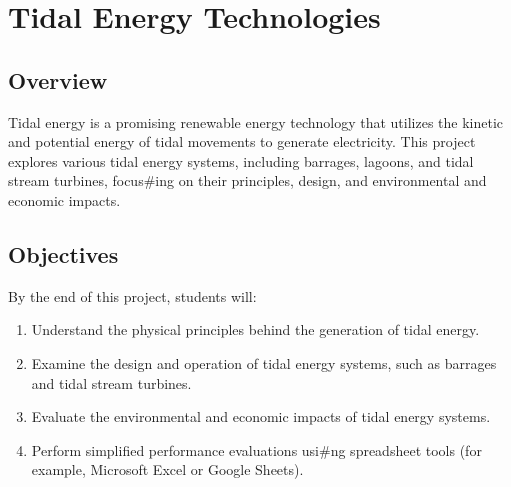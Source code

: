 \documentclass[letterpaper,10pt,english]{jupyterBook}
\begin{document}
\section{Tidal Energy Technologies}
\label{\detokenize{ProjectSyllabus:tidal-energy-technologies}}

\subsection{Overview}
\label{\detokenize{ProjectSyllabus:id12}}
\sphinxAtStartPar
Tidal energy is a promising renewable energy technology that utilizes
the kinetic and potential energy of tidal movements to generate
electricity. This project explores various tidal energy systems,
including barrages, lagoons, and tidal stream turbines, focus\#ing on
their principles, design, and environmental and economic impacts.


\subsection{Objectives}
\label{\detokenize{ProjectSyllabus:id13}}
\sphinxAtStartPar
By the end of this project, students will:
\begin{enumerate}
%
\item {} 
\sphinxAtStartPar
Understand the physical principles behind the generation of tidal
energy.

\item {} 
\sphinxAtStartPar
Examine the design and operation of tidal energy systems, such as
barrages and tidal stream turbines.

\item {} 
\sphinxAtStartPar
Evaluate the environmental and economic impacts of tidal energy
systems.

\item {} 
\sphinxAtStartPar
Perform simplified performance evaluations usi\#ng spreadsheet tools
(for example, Microsoft Excel or Google Sheets).

\end{enumerate}
\end{document}
